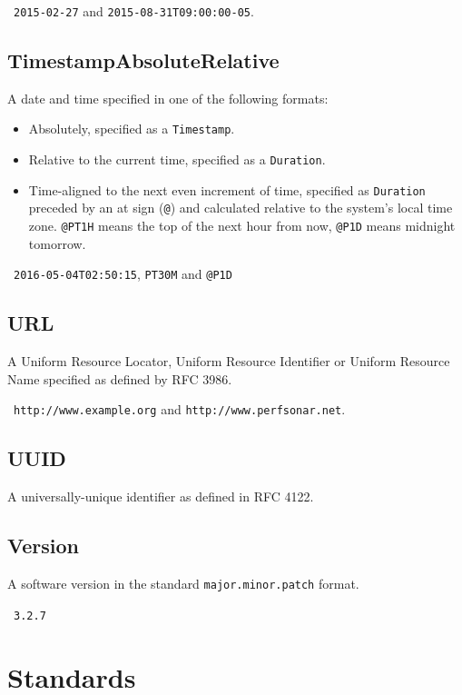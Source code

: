 \documentclass[10pt]{article}
\begin{document}
\example\ {\tt 2015-02-27} and {\tt 2015-08-31T09:00:00-05}.



\subsection{TimestampAbsoluteRelative}
A date and time specified in one of the following formats:
\begin{itemize}
\item Absolutely, specified as a {\tt Timestamp}.
\item Relative to the current time, specified as a {\tt Duration}.
\item Time-aligned to the next even increment of time, specified as
  {\tt Duration} preceded by an at sign ({\tt @}) and calculated
  relative to the system's local time zone.  {\tt @PT1H} means the top
  of the next hour from now, {\tt @P1D} means midnight tomorrow.
\end{itemize}

\example\ {\tt 2016-05-04T02:50:15}, {\tt PT30M} and {\tt @P1D}



\subsection{URL}
A Uniform Resource Locator, Uniform Resource Identifier or Uniform
Resource Name specified as defined by RFC 3986.

\example\ {\tt http://www.example.org} and {\tt http://www.perfsonar.net}.



\subsection{UUID}
A universally-unique identifier as defined in RFC 4122.



\subsection{Version}
A software version in the standard {\tt major.minor.patch} format.

\example\ {\tt 3.2.7}




%
%

\section{Standards}\label{standards}
\end{document}
